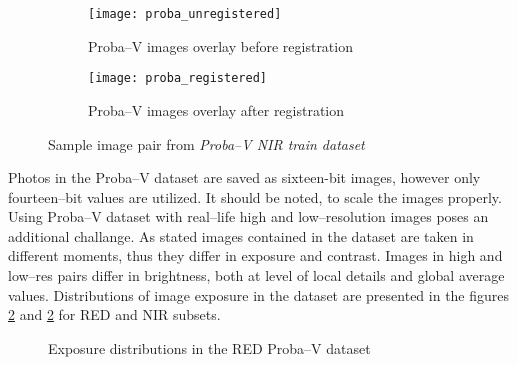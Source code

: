 \begin{figure}
    \begin{subfigure}{0.45\textwidth}
        \centering
        \texttt{[image: proba\_unregistered]}
        \caption{Proba--V images overlay before registration}
    \end{subfigure}
    \hfill
    \begin{subfigure}{0.45\textwidth}
        \centering
        \texttt{[image: proba\_registered]}
        \caption{Proba--V images overlay after registration}
    \end{subfigure}
    \caption{Sample image pair from \textit{Proba--V NIR train dataset}}
    \label{fig:proba-registration}
\end{figure}

Photos in the Proba--V dataset are saved as sixteen-bit images, however only fourteen--bit values are utilized.
It should be noted, to scale the images properly.
Using Proba--V dataset with real--life high and low--resolution images poses an additional challange.
As stated images contained in the dataset are taken in different moments, thus they differ in exposure and contrast.
Images in high and low--res pairs differ in brightness, both at level of local details and global average values.
Distributions of image exposure in the dataset are presented in the figures \ref{fig:exposure-dist-red} and \ref{fig:exposure-dist-red} for RED and NIR subsets.
\begin{figure}
        \centering
    \caption{Exposure distributions in the RED Proba--V dataset}
    \label{fig:exposure-dist-red}
\end{figure}
